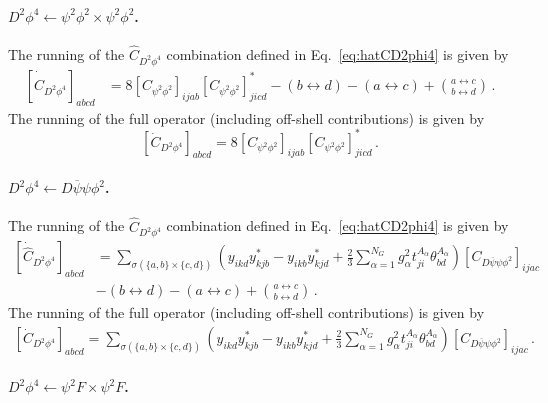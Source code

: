 \paragraph{\texorpdfstring{$D^2 \phi^4 \leftarrow \psi^2 \phi^2 \times \psi^2 \phi^2 $}{D2phi4frompsi2phi2xpsi2phi2}.}

The running of the $\widehat C_{D^2\phi^4}$ combination defined in Eq.~\eqref{eq:hatCD2phi4} is given by
\begin{align}
    \left[\dot{\widehat C}_{D^2\phi^4}\right]_{abcd} &= 
    8\left[C_{\psi^2\phi^2}\right]_{ijab} \left[C_{\psi^2\phi^2}\right]^*_{jicd} - (b \leftrightarrow d) - (a \leftrightarrow c) + \binom{a \leftrightarrow c}{b \leftrightarrow d} \,.
\end{align}
The running of the full operator (including off-shell contributions) is given by
\begin{equation}
    \left[\dot C_{D^2\phi^4}\right]_{abcd} = 8\left[C_{\psi^2\phi^2}\right]_{ijab} \left[C_{\psi^2\phi^2}\right]^*_{jicd}\,.
\end{equation}

\paragraph{$D^2 \phi^4 \leftarrow D \overline \psi \psi \phi^2$.}

The running of the $\widehat C_{D^2\phi^4}$ combination defined in Eq.~\eqref{eq:hatCD2phi4} is given by
\begin{align}
    \left[\dot{\widehat C}_{D^2\phi^4}\right]_{abcd} &= 
    \sum_{\sigma(\{a,b\}\times \{c,d\})}\left(
    y_{ikd}y^*_{kjb} - y_{ikb}y^*_{kjd}+\frac{2}{3}\sum_{\alpha=1}^{N_G}g_\alpha^2 t^{A_\alpha}_{ji}\theta^{A_\alpha}_{bd}
    \right) \left[C_{D\overline \psi \psi \phi^2}\right]_{ijac}\nonumber \\
    &-  (b \leftrightarrow d) - (a \leftrightarrow c) + \binom{a \leftrightarrow c}{b \leftrightarrow d}
    \,.
\end{align}
The running of the full operator (including off-shell contributions) is given by
\begin{align}
    \left[\dot C_{D^2\phi^4}\right]_{abcd} = 
    \sum_{\sigma(\{a,b\}\times \{c,d\})}\left(
    y_{ikd}y^*_{kjb} - y_{ikb}y^*_{kjd}+\frac{2}{3}\sum_{\alpha=1}^{N_G}g_\alpha^2 t^{A_\alpha}_{ji}\theta^{A_\alpha}_{bd}
    \right) \left[C_{D\overline \psi \psi \phi^2}\right]_{ijac}
    \,.
\end{align}

\paragraph{$D^2\phi^4 \leftarrow \psi^2 F \times \psi^2 F$.}

